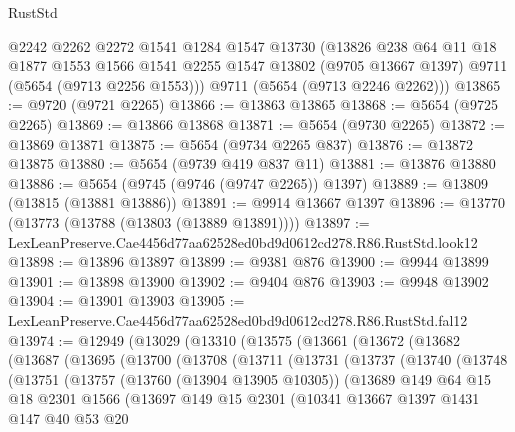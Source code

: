 \begin{lexlean}{RustStd}
\begin{coremodule}
      @2242
      @2262
      @2272
      @1541
      @1284
      @1547
      @13730
      (@13826
        @238
        @64
        @11
        @18
        @1877
        @1553
        @1566
        @1541
        @2255
        @1547
        @13802
        (@9705 @13667 @1397)
        @9711
        (@5654 (@9713 @2256 @1553)))
      @9711
      (@5654 (@9713 @2246 @2262)))
@13865 := @9720 (@9721 @2265)
@13866 := @13863 @13865
@13868 := @5654 (@9725 @2265)
@13869 := @13866 @13868
@13871 := @5654 (@9730 @2265)
@13872 := @13869 @13871
@13875 := @5654 (@9734 @2265 @837)
@13876 := @13872 @13875
@13880 := @5654 (@9739 @419 @837 @11)
@13881 := @13876 @13880
@13886 := @5654 (@9745 (@9746 (@9747 @2265)) @1397)
@13889 := @13809 (@13815 (@13881 @13886))
@13891 := @9914 @13667 @1397
@13896 := @13770 (@13773 (@13788 (@13803 (@13889 @13891))))
@13897 := LexLeanPreserve.Cae4456d77aa62528ed0bd9d0612cd278.R86.RustStd.look12
@13898 := @13896 @13897
@13899 := @9381 @876
@13900 := @9944 @13899
@13901 := @13898 @13900
@13902 := @9404 @876
@13903 := @9948 @13902
@13904 := @13901 @13903
@13905 := LexLeanPreserve.Cae4456d77aa62528ed0bd9d0612cd278.R86.RustStd.fal12
@13974 := @12949
    (@13029
      (@13310
        (@13575
          (@13661
            (@13672
              (@13682
                (@13687
                  (@13695
                    (@13700
                      (@13708
                        (@13711
                          (@13731
                            (@13737
                              (@13740
                                (@13748
                                  (@13751
                                    (@13757
                                      (@13760 (@13904 @13905 @10305))
                                      (@13689
                                        @149
                                        @64
                                        @15
                                        @18
                                        @2301
                                        @1566
                                        (@13697
                                          @149
                                          @15
                                          @2301
                                          (@10341
                                            @13667
                                            @1397
                                            @1431
                                            @147
                                            @40
                                            @53
                                            @20

\end{coremodule}
\end{lexlean}
